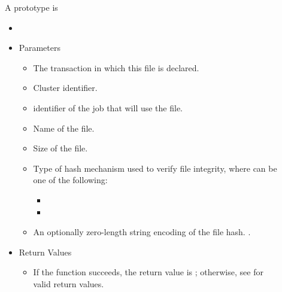 \begin{description}
\item []
  A prototype is 
  
  \begin{itemize}
    \item[] 
    \item[] Parameters
    \begin{itemize}
      \item[]  

      The transaction in which this file is declared.
      \item[]  

      Cluster identifier.
      \item[] 

      identifier of the job that will use the file.
      \item[] 

      Name of the file.
      \item[]  

      Size of the file.
      \item[] 

      Type of hash mechanism used to verify file integrity, where 
       can be one of the following:


      \begin{itemize}
        \item[] 
	\item[] 
      \end{itemize}
      
      \item[] 

      An optionally zero-length string encoding of the file hash.
      .
    \end{itemize}
    \item[] Return Values
    \begin{itemize}
      \item[] If the function succeeds, the return value is ; 
      otherwise, see  for valid return values. 
    \end{itemize}
  \end{itemize}   


\end{description}
